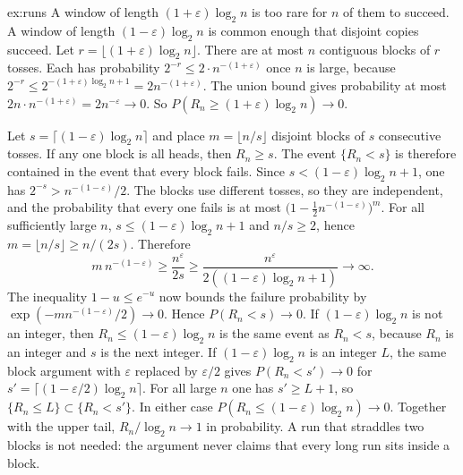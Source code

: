 \begin{solution}{ex:runs}
\idea A window of length $(1+\varepsilon)\log_2 n$ is too rare for $n$ of them to succeed. A window of length $(1-\varepsilon)\log_2 n$ is common enough that disjoint copies succeed.
\writeup Let $r=\lfloor(1+\varepsilon)\log_2 n\rfloor$. There are at most $n$ contiguous blocks of $r$ tosses. Each has probability $2^{-r}\le 2\cdot n^{-(1+\varepsilon)}$ once $n$ is large, because $2^{-r}\le 2^{-(1+\varepsilon)\log_2 n+1}=2 n^{-(1+\varepsilon)}$. The union bound gives probability at most $2n\cdot n^{-(1+\varepsilon)}=2n^{-\varepsilon}\to0$. So $P(R_n\ge(1+\varepsilon)\log_2 n)\to0$.

Let $s=\lceil(1-\varepsilon)\log_2 n\rceil$ and place $m=\lfloor n/s\rfloor$ disjoint blocks of $s$ consecutive tosses. If any one block is all heads, then $R_n\ge s$. The event $\{R_n<s\}$ is therefore contained in the event that every block fails. Since $s<(1-\varepsilon)\log_2 n+1$, one has $2^{-s}>n^{-(1-\varepsilon)}/2$. The blocks use different tosses, so they are independent, and the probability that every one fails is at most $\bigl(1-\tfrac12 n^{-(1-\varepsilon)}\bigr)^m$. For all sufficiently large $n$, $s\le(1-\varepsilon)\log_2 n+1$ and $n/s\ge2$, hence $m=\lfloor n/s\rfloor\ge n/(2s)$. Therefore
\[
 m\,n^{-(1-\varepsilon)}\ge\frac{n^\varepsilon}{2s}
 \ge\frac{n^\varepsilon}{2((1-\varepsilon)\log_2n+1)}\longrightarrow\infty.
\]
The inequality $1-u\le e^{-u}$ now bounds the failure probability by $\exp(-m n^{-(1-\varepsilon)}/2)\to0$. Hence $P(R_n<s)\to0$. If $(1-\varepsilon)\log_2 n$ is not an integer, then $R_n\le(1-\varepsilon)\log_2 n$ is the same event as $R_n<s$, because $R_n$ is an integer and $s$ is the next integer. If $(1-\varepsilon)\log_2 n$ is an integer $L$, the same block argument with $\varepsilon$ replaced by $\varepsilon/2$ gives $P(R_n<s')\to0$ for $s'=\lceil(1-\varepsilon/2)\log_2 n\rceil$. For all large $n$ one has $s'\ge L+1$, so $\{R_n\le L\}\subset\{R_n<s'\}$. In either case $P(R_n\le(1-\varepsilon)\log_2 n)\to0$. Together with the upper tail, $R_n/\log_2 n\to1$ in probability. A run that straddles two blocks is not needed: the argument never claims that every long run sits inside a block.
\end{solution}


